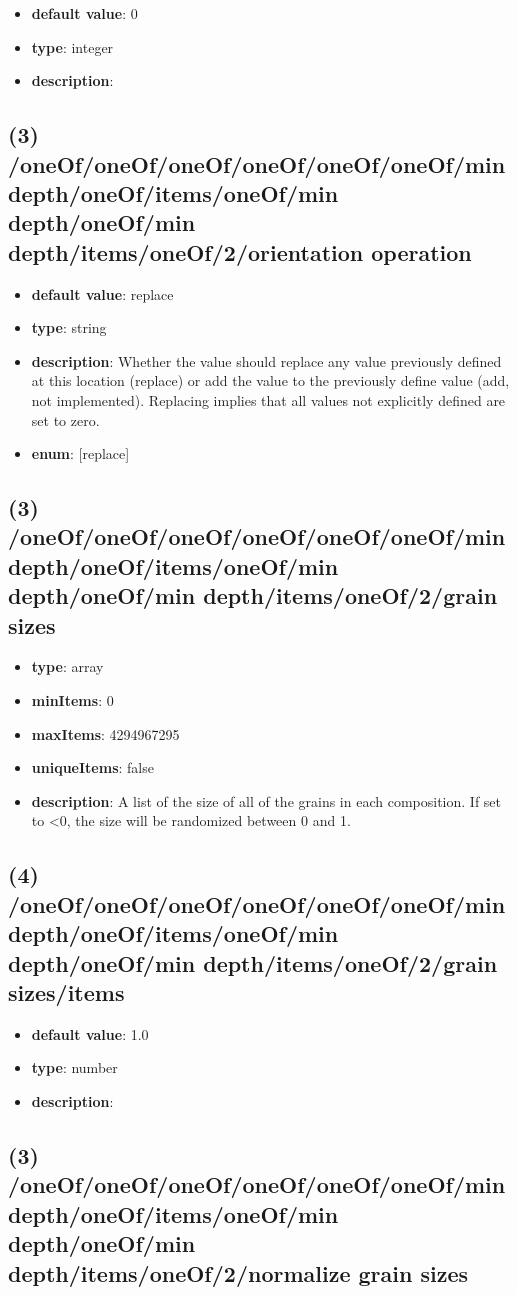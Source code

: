 \begin{itemize}[leftmargin=4em]\item {\bf default value}: 0
\item {\bf type}: integer
\item {\bf description}: 
\end{itemize}\subsection{(3) /oneOf/oneOf/oneOf/oneOf/oneOf/oneOf/min depth/oneOf/items/oneOf/min depth/oneOf/min depth/items/oneOf/2/orientation operation}
\begin{itemize}[leftmargin=3em]\item {\bf default value}: replace
\item {\bf type}: string
\item {\bf description}: Whether the value should replace any value previously defined at this location (replace) or add the value to the previously define value (add, not implemented). Replacing implies that all values not explicitly defined are set to zero.
\item {\bf enum}: [replace]\end{itemize}\subsection{(3) /oneOf/oneOf/oneOf/oneOf/oneOf/oneOf/min depth/oneOf/items/oneOf/min depth/oneOf/min depth/items/oneOf/2/grain sizes}
\begin{itemize}[leftmargin=3em]\item {\bf type}: array
\item {\bf minItems}: 0
\item {\bf maxItems}: 4294967295
\item {\bf uniqueItems}: false
\item {\bf description}: A list of the size of all of the grains in each composition. If set to <0, the size will be randomized between 0 and 1.
\end{itemize}\subsection{(4) /oneOf/oneOf/oneOf/oneOf/oneOf/oneOf/min depth/oneOf/items/oneOf/min depth/oneOf/min depth/items/oneOf/2/grain sizes/items}
\begin{itemize}[leftmargin=4em]\item {\bf default value}: 1.0
\item {\bf type}: number
\item {\bf description}: 
\end{itemize}\subsection{(3) /oneOf/oneOf/oneOf/oneOf/oneOf/oneOf/min depth/oneOf/items/oneOf/min depth/oneOf/min depth/items/oneOf/2/normalize grain sizes}
